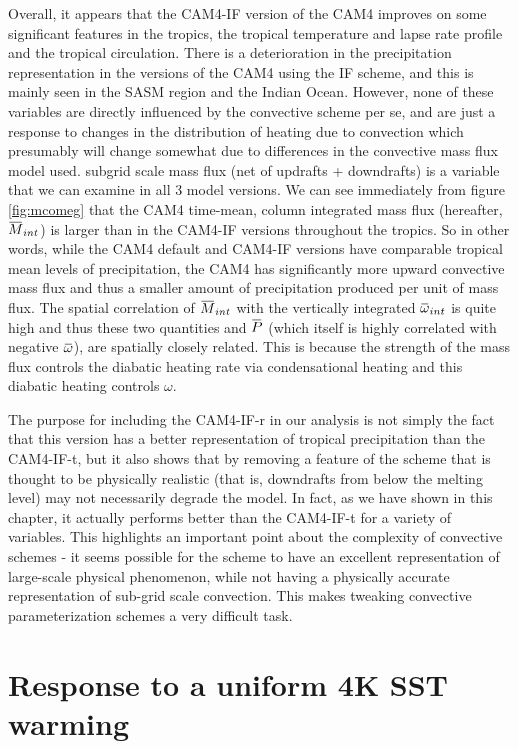 \documentclass[letterpaper,12pt,titlepage,oneside,final]{book}
\newcommand{\overbar}[1]{\mkern 1.5mu\overline{\mkern-1.5mu#1\mkern-1.5mu}\mkern 1.5mu}
\begin{document}
Overall, it appears that the CAM4-IF version of the CAM4 improves on some significant features in the tropics, the tropical temperature and lapse rate profile and the tropical circulation. There is a deterioration in the precipitation representation in the versions of the CAM4 using the IF scheme, and this is mainly seen in the SASM region and the Indian Ocean. However, none of these variables are directly influenced by the convective scheme per se, and are just a response to changes in the distribution of heating due to convection which presumably will change somewhat due to differences in the convective mass flux model used. subgrid scale mass flux (net of updrafts + downdrafts) is a variable that we can examine in all 3 model versions. We can see immediately from figure \ref{fig:mcomeg} that the CAM4 time-mean, column integrated mass flux (hereafter, $\overbar{M}_{int}$) is larger than in the CAM4-IF versions throughout the tropics.  So in other words, while the CAM4 default and CAM4-IF versions have comparable tropical mean levels of precipitation, the CAM4 has significantly more upward convective mass flux and thus a smaller amount of precipitation produced per unit of mass flux. The spatial correlation of $\overbar{M}_{int}$ with the vertically integrated $\overbar{\omega}_{int}$ is quite high and thus these two quantities and $\overbar{P}$ (which itself is highly correlated with negative $\overbar{\omega}$), are spatially closely related. This is because the strength of the mass flux controls the diabatic heating rate via condensational heating and this diabatic heating controls $\omega$. 

The purpose for including the CAM4-IF-r in our analysis is not simply the fact that this version has a better representation of tropical precipitation than the CAM4-IF-t, but it also shows that by removing a feature of the scheme that is thought to be physically realistic (that is, downdrafts from below the melting level) may not necessarily degrade the model. In fact, as we have shown in this chapter, it actually performs better than the CAM4-IF-t for a variety of variables. This highlights an important point about the complexity of convective schemes - it seems possible for the scheme to have an excellent representation of large-scale physical phenomenon, while not having a physically accurate representation of sub-grid scale convection. This makes tweaking convective parameterization schemes a very difficult task.

\section{Response to a uniform 4K SST warming}
\end{document}
